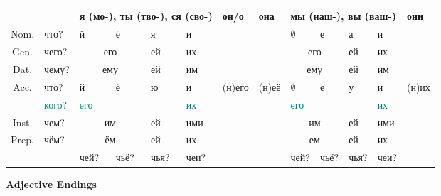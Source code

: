 \documentclass[a4paper, landscape, 11pt]{article}
\newcommand{\an}[1]{\textcolor{teal}{#1}} %
\begin{document}
\begin{tabularx}{\textwidth}{|c|X|X|X|X|X|X|X|X|X|X|X|X|}
	\hline
	\strut & \strut     & \multicolumn{4}{l|}{я (мо-), ты (тво-), ся (сво-)} & он/о   & она    & \multicolumn{4}{l|}{мы (наш-), вы (ваш-)}   & они    \\ \hline
	  Nom.    & что?       & й        & ё             & я      & и              & \strut & \strut & $\emptyset$ & е          & а      & и       & \strut \\ %
	  Gen.    & чего?      & \multicolumn{2}{c|}{его} & ей     & их             & \strut & \strut & \multicolumn{2}{c|}{его} & ей     & их      & \strut \\ %
	  Dat.    & чему?      & \multicolumn{2}{c|}{ему} & ей     & им             & \strut & \strut & \multicolumn{2}{c|}{ему} & ей     & им      & \strut \\ %
	  Acc.    & что?       & й        & ё             & ю      & и              & (н)его & (н)её  & $\emptyset$ & е          & у      & и       & (н)их  \\
	\strut & \an{кого?} & \an{его} & \strut        & \strut & \an{их}        & \strut & \strut & \an{его}    & \strut     & \strut & \an{их} & \strut \\ %
	  Inst.    & чем?       & \multicolumn{2}{c|}{им}  & ей     & ими            & \strut & \strut & \multicolumn{2}{c|}{им}  & ей     & ими     & \strut \\ %
	  Prep.    & чём?       & \multicolumn{2}{c|}{ём}  & ей     & их             & \strut & \strut & \multicolumn{2}{c|}{ем}  & ей     & их      & \strut \\ \hline
	\strut & \strut     & чей?     & чьё?          & чья?   & чеи?           & \strut & \strut & чей?        & чьё?       & чья?   & чеи?    & \strut \\ \hline
\end{tabularx}

\vfill\strut

\newpage

\begin{center}
	\Huge\bfseries Adjective Endings
\end{center}
\end{document}
